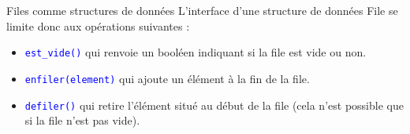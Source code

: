\documentclass[10pt]{beamer}
\begin{document}
\begin{frame}{\SL}
	\mframe{\SL}
	\begin{alertblock}{Files comme structures de données}
		L'interface d'une structure de données File se limite donc aux opérations suivantes :
		\begin{itemize}[label=\textbullet]
			\item<2-> \textcolor{blue}{\tt est\_vide()} qui renvoie un booléen indiquant si la file est vide ou non.
			\item<3-> \textcolor{blue}{\tt enfiler(element)} qui ajoute un élément à la fin de la file.
			\item<4-> \textcolor{blue}{\tt defiler()} qui retire l'élément situé au début de la file (cela n'est possible que si la file n'est pas vide).
		\end{itemize}
	\end{alertblock}
\end{frame}
\end{document}

